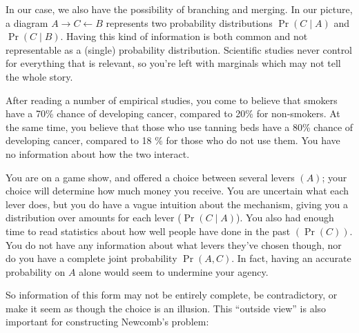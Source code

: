 \documentclass{article}
\begin{document}
	In our case, we also have the possibility of branching and merging. In our picture, a diagram $A \rightarrow C \leftarrow B$ represents two probability distributions $\Pr(C\mid A)$ and $\Pr(C \mid B)$.
	Having this kind of information is both common and not representable as a (single) probability distribution. Scientific studies never control for everything that is relevant, so you're left with marginals which may not tell the whole story.
	
	\begin{example}
		After reading a number of empirical studies, you come to believe that smokers have a 70\% chance of developing cancer, compared to 20\% for non-smokers. At the same time, you believe that those who use tanning beds have a 80\% chance of developing cancer, compared to 18 \% for those who do not use them. You have no information about how the two interact.
	\end{example}
	
	\begin{example}
		You are on a game show, and offered a choice between several levers $(A)$; your choice will determine how much money you receive. You are uncertain what each lever does, but you do have a vague intuition about the mechanism, giving you a distribution over amounts for each lever ($\Pr(C \mid A)$). You also had enough time to read statistics about how well people have done in the past $(\Pr(C))$. You do not have any information about what levers they've chosen though, nor do you have a complete joint probability $\Pr(A, C)$. In fact, having an accurate probability on $A$ alone would seem to undermine your agency.
	\end{example}


	So information of this form may not be entirely complete, be contradictory, or make it seem as though the choice is an illusion. This ``outside view'' is also important for constructing Newcomb's problem:
	
\end{document}

